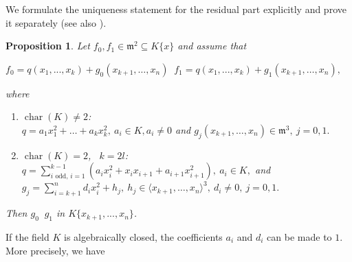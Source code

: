 \documentclass[11pt]{article}
\DeclareMathOperator{\rsim}{\stackrel{r}{\sim}}
\DeclareMathOperator{\Char}{char}
\newtheorem{Proposition}[Definition]{Proposition }
\newcommand{\fm}{\mathfrak{m}}
\begin{document}
We formulate the uniqueness statement for the residual part explicitly and prove it separately (see also \cite[Theorem 2.1 and Theorem 3.5]{GP25}).
\begin{Proposition}\label{prop.split}
Let $f_0, f_1\in\fm^2\subseteq K\{x\}$ and assume that 
\begin{center}
$f_0 = q(x_1,...,x_{k})+g_0(x_{k+1},\dots,x_n) 
\rsim f_1 = q(x_1,...,x_{k})+g_1(x_{k+1},\dots,x_n),$
\end{center}
where
\begin{enumerate}
\item $\Char (K) \ne 2$:\\
$ q=a_1x_1^2+\ldots+a_kx_k^2, \ a_i \in K, a_i \ne 0$ and
$g_j(x_{k+1},\dots,x_n) \in \fm^3, \ j=0,1.$
  
\item$\Char(K) = 2$, \ $k=2l$:\\
$ q=\sum_{i \text{ odd, } i=1}^{k-1}(a_i x_i^2 + x_ix_{i+1} +
a_{i+1} x_{i+1}^2), \ a_i \in K,$ and
$g_j = \sum_{i=k+1}^{n}d_i x_i^2 + h_j, \ h_j\in \langle x_{k+1},\ldots,x_{n} \rangle^3, \ d_i \ne0, \ j=0,1.$
\end{enumerate}
Then $g_0 \rsim g_1$ in $K\{ x_{k+1},...,x_n\}$.
\end{Proposition}

If the field $K$ is algebraically closed, the coefficients $a_i$ and $d_i$ can be made to $1$. More precisely, we have
\end{document}

